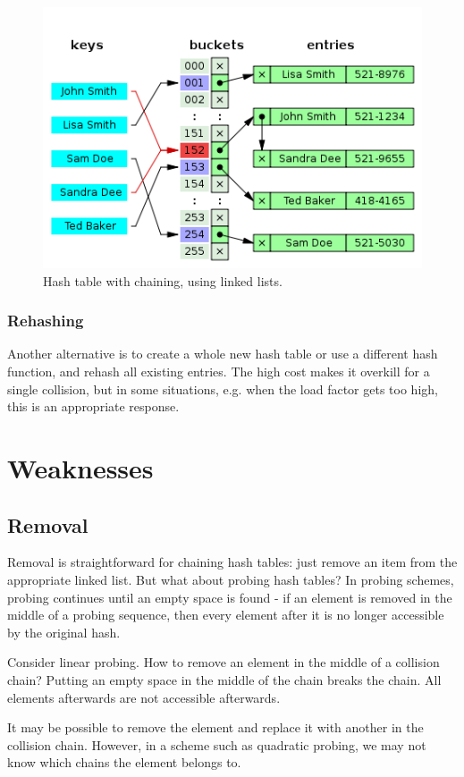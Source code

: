 \documentclass{article}
\begin{document}
\begin{figure}
\centering
\includegraphics[scale=0.7]{img/chaining.png}
\caption{Hash table with chaining, using linked lists.}
\end{figure}

\subsubsection{Rehashing}
Another alternative is to create a whole new hash table or use a different hash function, and rehash all existing entries.  The high cost makes it overkill for a single collision, but in some situations, e.g. when the load factor gets too high, this is an appropriate response.

\section{Weaknesses}
\subsection{Removal}
Removal is straightforward for chaining hash tables: just remove an item from the appropriate linked list.  But what about probing hash tables?  In probing schemes, probing continues until an empty space is found - if an element is removed in the middle of a probing sequence, then every element after it is no longer accessible by the original hash.

Consider linear probing.  How to remove an element in the middle of a collision chain?  Putting an empty space in the middle of the chain breaks the chain.  All elements afterwards are not accessible afterwards.

It may be possible to remove the element and replace it with another in the collision chain.  However, in a scheme such as quadratic probing, we may not know which chains the element belongs to.
\end{document}
